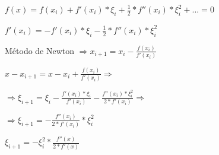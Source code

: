 \begin{description}
\item[] $f(x) = f(x_{i}) + f'(x_{i}) \ast \xi_{i} + \displaystyle \frac{1}{2} \ast f''(x_{i}) \ast \xi_{i}^{2} + ... = 0$

\item[] $f'(x_{i}) = - f'(x_{i}) \ast \xi_{i} - \displaystyle \frac{1}{2} \ast f''(x_{i}) \ast \xi_{i}^{2}$

\item[] Método de Newton $\displaystyle \Rightarrow x_{i+1} = x_{i} - \frac{f(x_{i})}{f'(x_{i})} $

\item[] $\displaystyle x - x_{i+1} = x - x_{i} + \frac{f(x_{i})}{f'(x_{i})} \Rightarrow$

\item[] $\displaystyle  \Rightarrow \xi_{i+1} = \xi_{i} - \frac{f'(x_{i}) \ast \xi_{i}}{f'(x_{i})} - \frac{f''(x_{i}) \ast \xi_{i}^{2}}{2 \ast f'(x_{i})} \Rightarrow$

\item[] $\displaystyle \Rightarrow \xi_{i+1} = - \frac{f''(x_{i})}{2 \ast f'(x_{i})} \ast \xi_{i}^{2}$

\item[] $\displaystyle \xi_{i+1} = - \xi_{i}^{2} \ast \frac{f''(x)}{2 \ast f'(x)}$

\end{description}